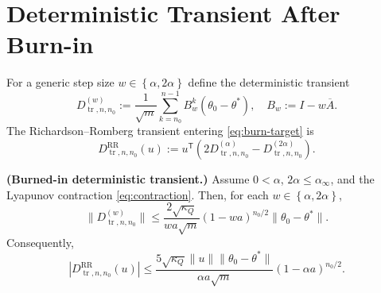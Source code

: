 
\section{Deterministic Transient After Burn-in}

For a generic step size $w \in \left\{ \alpha, 2 \alpha \right\}$ define the deterministic
transient
\begin{equation}
D_{\operatorname{tr}, n, n_{0}}^{(w)}
  := \frac{1}{\sqrt{m}} \sum_{k = n_{0}}^{n - 1}
      B_{w}^{k} (\theta_{0} - \theta^{*}),
\quad
B_{w} := I - w \overline{A}.
\label{eq:burn-single-transient}
\end{equation}
The Richardson--Romberg transient entering \eqref{eq:burn-target} is
\begin{equation}
D_{\operatorname{tr}, n, n_{0}}^{\mathrm{RR}}(u)
  := u^{\mathsf{T}} \left( 2 D_{\operatorname{tr}, n, n_{0}}^{(\alpha)}
      - D_{\operatorname{tr}, n, n_{0}}^{(2 \alpha)} \right).
\label{eq:burn-RR-transient}
\end{equation}

\begin{lemma}\label{lem:burn-deterministic-transient}
  \textbf{(Burned-in deterministic transient.)}
  Assume $0 < \alpha$, $2 \alpha \le \alpha_{\infty}$, and the Lyapunov contraction
  \eqref{eq:contraction}. Then, for each $w \in \left\{ \alpha, 2 \alpha \right\}$,
  \begin{equation}
\lVert D_{\operatorname{tr}, n, n_{0}}^{(w)} \rVert
    \le \frac{2 \sqrt{\kappa_{Q}}}{w a \sqrt{m}}
       (1 - w a)^{n_{0} / 2} \lVert \theta_{0} - \theta^{*} \rVert.
\label{eq:burn-single-transient-bound}
\end{equation}
  Consequently,
  \begin{equation}
| D_{\operatorname{tr}, n, n_{0}}^{\mathrm{RR}}(u) |
    \le \frac{5 \sqrt{\kappa_{Q}} \lVert u \rVert \lVert \theta_{0} - \theta^{*} \rVert}{\alpha a \sqrt{m}}
       (1 - \alpha a)^{n_{0} / 2}.
\label{eq:burn-RR-transient-bound}
\end{equation}
\end{lemma}

